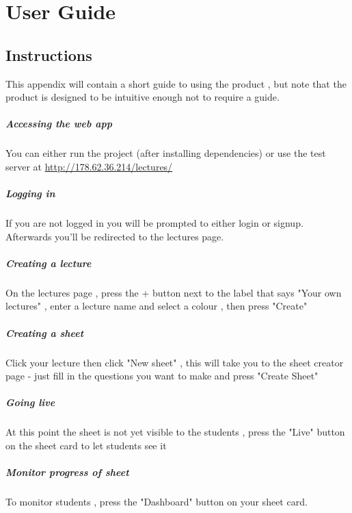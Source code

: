 \chapter{User Guide}
\section{Instructions}
This appendix will contain a short guide to using the product , but note that the product is designed to be intuitive enough not to require a guide.

\paragraph{Accessing the web app} You can either run the project (after installing dependencies) or use the test server at \url{http://178.62.36.214/lectures/}

\paragraph{Logging in} If you are not logged in you will be prompted to either login or signup. Afterwards you'll be redirected to the lectures page.

\paragraph{Creating a lecture} On the lectures page , press the + button next to the label that says "Your own lectures" , enter a lecture name and select a colour , then press "Create"

\paragraph{Creating a sheet} Click your lecture then click "New sheet" , this will take you to the sheet creator page - just fill in the questions you want to make and press "Create Sheet"

\paragraph{Going live} At this point the sheet is not yet visible to the students , press the "Live" button on the sheet card to let students see it

\paragraph{Monitor progress of sheet} To monitor students , press the "Dashboard" button on your sheet card.